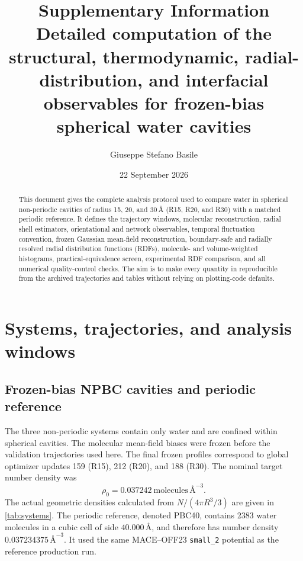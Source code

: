 \documentclass[11pt]{article}
\title{Supplementary Information\\[0.5em]
Detailed computation of the structural, thermodynamic, radial-distribution,
and interfacial observables for frozen-bias spherical water cavities}
\author{Giuseppe Stefano Basile}
\date{22 September 2026}
\newcommand{\angstrom}{\text{\AA}}
\begin{document}
\maketitle

\begin{abstract}
This document gives the complete analysis protocol used to compare water in
spherical non-periodic cavities of radius 15, 20, and \(30\,\angstrom\)
(R15, R20, and R30) with a matched periodic reference.  It defines the
trajectory windows, molecular reconstruction, radial shell estimators,
orientational and network observables, temporal fluctuation convention,
frozen Gaussian mean-field reconstruction, boundary-safe and radially
resolved radial distribution functions (RDFs), molecule- and volume-weighted
histograms, practical-equivalence screen, experimental RDF comparison, and
all numerical quality-control checks.  The aim is to make every quantity in
 reproducible from the archived trajectories and
tables without relying on plotting-code defaults.
\end{abstract}

\tableofcontents

\section{Systems, trajectories, and analysis windows}

\subsection{Frozen-bias NPBC cavities and periodic reference}

The three non-periodic systems contain only water and are confined within
spherical cavities.  The molecular mean-field biases were frozen before the
validation trajectories used here.  The final frozen profiles correspond to
global optimizer updates 159 (R15), 212 (R20), and 188 (R30).  The nominal
target number density was
\begin{equation}
  \rho_0 = 0.037242\ \text{molecules}\,\angstrom^{-3}.
\end{equation}
The actual geometric densities calculated from \(N/(4\pi R^3/3)\) are given
in \cref{tab:systems}.  The periodic reference, denoted PBC40, contains 2383
water molecules in a cubic cell of side \(40.000\,\angstrom\), and therefore
has number density \(0.037234375\,\angstrom^{-3}\).  It used the same
MACE--OFF23 \texttt{small\_2} potential as the reference production run.
\end{document}
